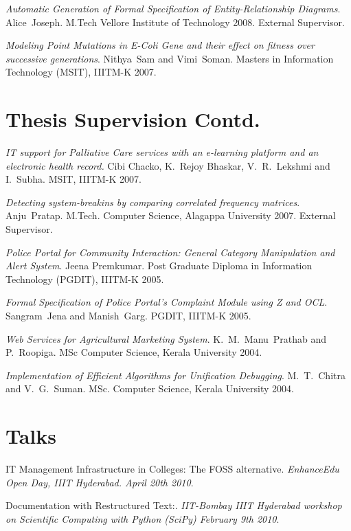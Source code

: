 \documentclass[11pt,margin,line]{res}
\begin{document}
\begin{resume}
{\em Automatic Generation of Formal Specification of
  Entity-Relationship Diagrams}.  Alice~Joseph.  M.Tech
Vellore Institute of Technology 2008.  External Supervisor.

{\em Modeling Point Mutations in E-Coli Gene and their
  effect on fitness over successive generations}.
Nithya~Sam and Vimi~Soman.  Masters in Information
Technology (MSIT), IIITM-K 2007.  


\newpage

\section{\sc Thesis Supervision Contd.}

{\em IT support for Palliative Care services with an
  e-learning platform and an electronic health record.}
Cibi Chacko, K.~Rejoy Bhaskar, V.~R.~Lekshmi and I.~Subha.
MSIT, IIITM-K 2007.

{\em Detecting system-breakins by comparing correlated
  frequency matrices}.  Anju~Pratap.  M.Tech. Computer
Science, Alagappa University 2007.  External Supervisor.

{\em Police Portal for Community Interaction: General
  Category Manipulation and Alert System}.  Jeena Premkumar.
Post Graduate Diploma in Information Technology (PGDIT),
IIITM-K 2005.

{\em Formal Specification of Police Portal's Complaint
  Module using Z and OCL}.  Sangram~Jena and Manish~Garg.
PGDIT, IIITM-K 2005. 

{\emph{Web Services for Agricultural Marketing System}}.
K.~M.~Manu~Prathab and P.~Roopiga.  MSc Computer Science,
Kerala University 2004.

{\em Implementation of Efficient Algorithms for Unification
  Debugging}.  M.~T.~Chitra and V.~G.~Suman.  MSc. Computer
Science, Kerala University 2004.

\vspace{2em}

\section{\sc Talks}

IT Management Infrastructure in Colleges: The FOSS
alternative. {\em EnhanceEdu Open Day, IIIT Hyderabad.  April 20th 2010}.


Documentation with Restructured Text:. {\em IIT-Bombay IIIT
  Hyderabad workshop on Scientific Computing with Python
  (SciPy) February 9th 2010}.



\end{resume}
\end{document}
